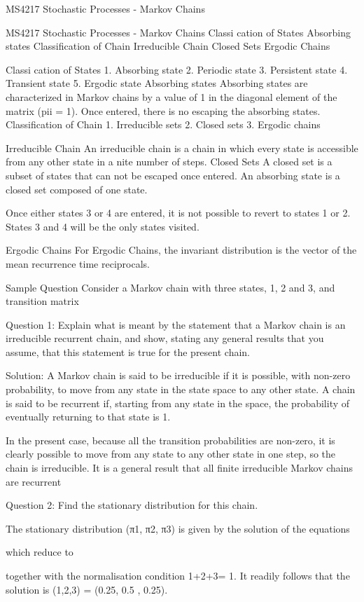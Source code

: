 MS4217 Stochastic Processes - Markov Chains

MS4217 Stochastic Processes - Markov Chains
Classi cation of States
Absorbing states
Classification of Chain
Irreducible Chain
Closed Sets
Ergodic Chains










Classi cation of States
1. Absorbing state
2. Periodic state
3. Persistent state
4. Transient state
5. Ergodic state
Absorbing states
Absorbing states are characterized in Markov chains by a value of 1 in the diagonal
element of the matrix (pii = 1). Once entered, there is no escaping the absorbing
states.
Classification of Chain
1. Irreducible sets
2. Closed sets
3. Ergodic chains

Irreducible Chain
An irreducible chain is a chain in which every state is accessible from any other state
in a nite number of steps.
Closed Sets
A closed set is a subset of states that can not be escaped once entered. An absorbing
state is a closed set composed of one state.



Once either states 3 or 4 are entered, it is not possible to
revert to states 1 or 2. States 3 and 4 will be the only states
visited.

Ergodic Chains
For Ergodic Chains, the invariant distribution is the vector of
the mean recurrence time reciprocals.

Sample Question
Consider a Markov chain with three states, 1, 2 and 3, and transition matrix 



Question 1: Explain what is meant by the statement that a Markov chain is an irreducible recurrent chain, and show, stating any general results that you assume, that this statement is true for the present chain.
 
Solution: A Markov chain is said to be irreducible if it is possible, with non-zero probability, to move from any state in the state space to any other state. A chain is said to be recurrent if, starting from any state in the space, the probability of eventually returning to that state is 1.

In the present case, because all the transition probabilities are non-zero, it is clearly possible to move from any state to any other state in one step, so the chain is irreducible. It is a general result that all finite irreducible Markov chains are recurrent

Question 2: Find the stationary distribution for this chain.

The stationary distribution (π1, π2, π3) is given by the solution of the equations

	

which reduce to

	

together with the normalisation condition 1+2+3= 1.
It readily follows that the solution is (1,2,3) = (0.25, 0.5 , 0.25).
